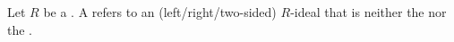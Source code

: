 \begin{definition} \label{definition:non_trivial_ideal_of_a_ring}
    Let $R$ be a . A  refers to an (left/right/two-sided) $R$-ideal that is neither the  nor the .
\end{definition}